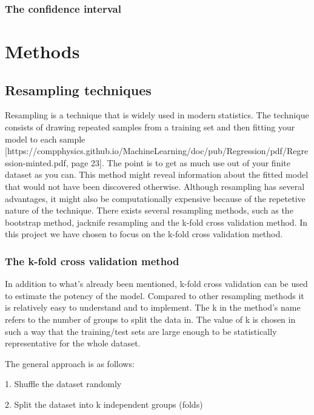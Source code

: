 \documentclass[a4paper,12pt]{article}
\begin{document}
\subsubsection{The confidence interval}

\section{Methods}
\subsection{Resampling techniques}
Resampling is a technique that is widely used in modern statistics. The technique consists of drawing repeated samples from a training set and then fitting your model to each sample [https://compphysics.github.io/MachineLearning/doc/pub/Regression/pdf/Regression-minted.pdf, page 23]. The point is to get as much use out of your finite dataset as you can. This method might reveal information about the fitted model that would not have been discovered otherwise.\newline
Although resampling has several advantages, it might also be computationally expensive because of the repetetive nature of the technique.
There exists several resampling methods, such as the bootstrap method, jacknife resampling and the k-fold cross validation method. In this project we have chosen to focus on the k-fold cross validation method.

\subsubsection{The k-fold cross validation method}
In addition to what's already been mentioned, k-fold cross validation can be used to estimate the potency of the model. Compared to other resampling methods it is relatively easy to understand and to implement. The k in the method's name refers to the number of groups to split the data in. The value of k is chosen in such a way that the training/test sets are large enough to be statistically representative for the whole dataset.\newline

The general approach is as follows:\newline

1. Shuffle the dataset randomly\newline

2. Split the dataset into k independent groups (folds)\newline
\end{document}
